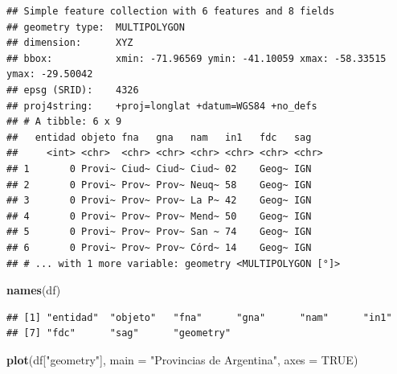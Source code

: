 \documentclass[]{book}
\newenvironment{Shaded}{\begin{snugshade}}{\end{snugshade}}
\newcommand{\DataTypeTok}[1]{\textcolor[rgb]{0.13,0.29,0.53}{#1}}
\newcommand{\KeywordTok}[1]{\textcolor[rgb]{0.13,0.29,0.53}{\textbf{#1}}}
\newcommand{\NormalTok}[1]{#1}
\newcommand{\OtherTok}[1]{\textcolor[rgb]{0.56,0.35,0.01}{#1}}
\newcommand{\StringTok}[1]{\textcolor[rgb]{0.31,0.60,0.02}{#1}}
\begin{document}
\begin{verbatim}
## Simple feature collection with 6 features and 8 fields
## geometry type:  MULTIPOLYGON
## dimension:      XYZ
## bbox:           xmin: -71.96569 ymin: -41.10059 xmax: -58.33515 ymax: -29.50042
## epsg (SRID):    4326
## proj4string:    +proj=longlat +datum=WGS84 +no_defs
## # A tibble: 6 x 9
##   entidad objeto fna   gna   nam   in1   fdc   sag  
##     <int> <chr>  <chr> <chr> <chr> <chr> <chr> <chr>
## 1       0 Provi~ Ciud~ Ciud~ Ciud~ 02    Geog~ IGN  
## 2       0 Provi~ Prov~ Prov~ Neuq~ 58    Geog~ IGN  
## 3       0 Provi~ Prov~ Prov~ La P~ 42    Geog~ IGN  
## 4       0 Provi~ Prov~ Prov~ Mend~ 50    Geog~ IGN  
## 5       0 Provi~ Prov~ Prov~ San ~ 74    Geog~ IGN  
## 6       0 Provi~ Prov~ Prov~ Córd~ 14    Geog~ IGN  
## # ... with 1 more variable: geometry <MULTIPOLYGON [°]>
\end{verbatim}

\begin{Shaded}
\begin{Highlighting}[]
\KeywordTok{names}\NormalTok{(df)}
\end{Highlighting}
\end{Shaded}

\begin{verbatim}
## [1] "entidad"  "objeto"   "fna"      "gna"      "nam"      "in1"     
## [7] "fdc"      "sag"      "geometry"
\end{verbatim}

\begin{Shaded}
\begin{Highlighting}[]
\KeywordTok{plot}\NormalTok{(df[}\StringTok{"geometry"}\NormalTok{], }
     \DataTypeTok{main =} \StringTok{"Provincias de Argentina"}\NormalTok{,}
     \DataTypeTok{axes =} \OtherTok{TRUE}\NormalTok{)}
\end{Highlighting}
\end{Shaded}
\end{document}
